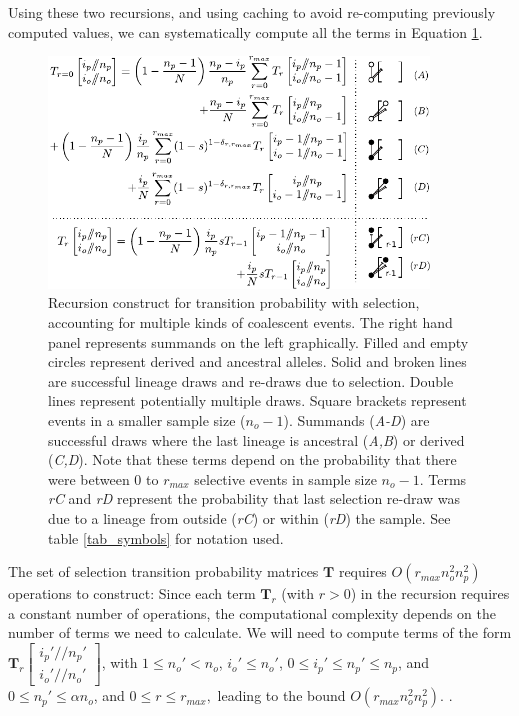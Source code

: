 \documentclass[review]{elsarticle}
\newcommand{\dslash}{/\!\!/}
\newcommand{\Coalc}[4]{\begin{bmatrix}#1\dslash #2 \\ #3\dslash #4 \end{bmatrix}}
\newcommand{\ikcomment}[1]{{\color{blue}{IK: #1}}}
\begin{document}
Using these two recursions, and using caching to avoid re-computing previously computed values,
we can systematically compute all the terms in Equation \ref{fig_rec_selection_dynamic_fail}.

\begin{figure}
  \centering
  \includegraphics[width=0.9\textwidth]{fig/recurrence-selection-dynamic-failures-annotated.pdf}

  \caption{Recursion construct for transition probability with selection, accounting for multiple
    kinds of coalescent events. The right hand panel represents summands on the left graphically.
    Filled and empty circles represent derived and ancestral alleles. Solid and broken lines are
    successful lineage draws and re-draws due to selection. Double lines represent potentially
    multiple draws. Square brackets represent events in a smaller sample size ($n_o-1$). Summands
    (\textit{A-D}) are successful draws where the last lineage is ancestral (\textit{A,B}) or
    derived (\textit{C,D}). Note that these terms depend on the probability that there were between
    $0$ to $r_{max}$ selective events in sample size $n_o-1$. Terms \textit{rC} and \textit{rD}
    represent the probability that last selection re-draw was due to a lineage from outside
    (\textit{rC}) or within (\textit{rD}) the sample. See table \ref{tab_symbols} for notation used.
  }

  \label{fig_rec_selection_dynamic_fail}
\end{figure}
 
The set of selection transition probability matrices $\mathbf{T}$ requires $O(r_{max}n_o^2 n_p^2)$
operations to construct: Since each term $\mathbf{T}_{r}$ (with $r>0$)  in the recursion requires a constant number of operations, 
the computational complexity depends on the number of terms we need to calculate. We will need to compute terms of the form 
 $\mathbf{T}_{r}\Coalc{i_p'}{n_p'}{i_o'}{n_o'}$, with $1 \leq n_o'<n_o$, $i_o' \leq n_o'$, $0\leq i_p' \leq n_p' \leq n_p$, and $0\leq n_p' \leq \alpha n_o$, 
 and $0\leq r \leq r_{max},$ leading to the bound $O(r_{max}n_o^2 n_p^2).$   
\ikcomment{What does the $\alpha$ represent above?} .
 
\end{document}

